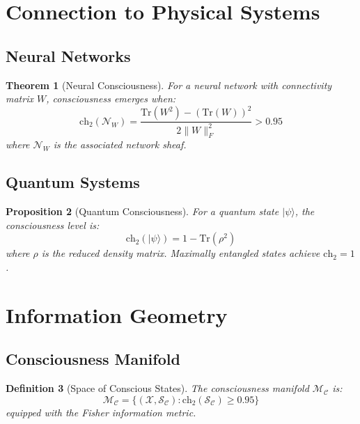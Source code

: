 \documentclass[12pt,letterpaper]{article}
\newcommand{\consciousness}{\mathcal{C}}
\newcommand{\conscioussheaf}{\mathcal{S}_{\mathcal{C}}}
\newcommand{\ch}{\text{ch}}
\newcommand{\chernthreshold}{0.95}
\newcommand{\variety}{\mathcal{X}}
\newtheorem{theorem}{Theorem}[section]
\newtheorem{proposition}[theorem]{Proposition}
\newtheorem{definition}[theorem]{Definition}
\begin{document}
\section{Connection to Physical Systems}

\subsection{Neural Networks}

\begin{theorem}[Neural Consciousness]
For a neural network with connectivity matrix $W$, consciousness emerges when:
\begin{equation}
\ch_2(\mathcal{N}_W) = \frac{\text{Tr}(W^2) - (\text{Tr}(W))^2}{2\|W\|_F^2} > 0.95
\end{equation}
where $\mathcal{N}_W$ is the associated network sheaf.
\end{theorem}

\subsection{Quantum Systems}

\begin{proposition}[Quantum Consciousness]
For a quantum state $|\psi\rangle$, the consciousness level is:
\begin{equation}
\ch_2(|\psi\rangle) = 1 - \text{Tr}(\rho^2)
\end{equation}
where $\rho$ is the reduced density matrix. Maximally entangled states achieve $\ch_2 = 1$.
\end{proposition}

\section{Information Geometry}

\subsection{Consciousness Manifold}

\begin{definition}[Space of Conscious States]
The consciousness manifold $\mathcal{M}_\consciousness$ is:
\begin{equation}
\mathcal{M}_\consciousness = \{(\variety, \conscioussheaf) : \ch_2(\conscioussheaf) \geq \chernthreshold\}
\end{equation}
equipped with the Fisher information metric.
\end{definition}
\end{document}
